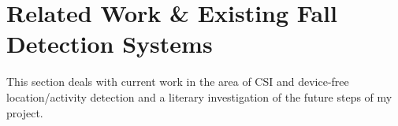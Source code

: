 \section{Related Work \& Existing Fall Detection Systems}
This section deals with current work in the area of CSI and device-free location/activity detection and a literary investigation of the future steps of my project. 
